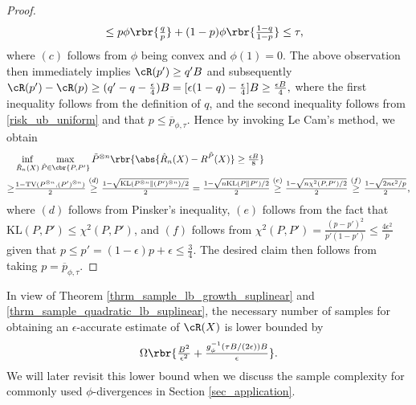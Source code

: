 \documentclass[9pt]{article} %
\numberwithin{equation}{section}
\renewcommand{\frac}[2]{\tfrac{#1}{#2}}
\begin{document}
\begin{proof}
\begin{align*}
& \leq p \phi \rbr{\frac{q}{p}} + (1-p) \phi \rbr{\frac{1-q}{1-p}} \leq \tau,
\end{align*}
where $(c)$ follows from $\phi$ being convex and $\phi(1) = 0$. 
The above observation then immediately implies  
$
\cR(p') \geq q'  B
$ 
and subsequently 
$
\cR(p') - \cR(p) \geq (q' - q - \frac{\epsilon}{4} ) B=[ \epsilon ( 1- q)  - \frac{\epsilon}{4} ] B \geq \frac{\epsilon B}{4},
$ 
where the first inequality follows from the definition of $q$, and the second inequality follows from \eqref{risk_ub_uniform} and that $p \leq \overline{p}_{\phi,\tau}$.
Hence by invoking Le Cam's method,
we obtain 
\begin{align*}
& \inf_{\hat{R}_n (X) } \max_{\tilde{P} \in \cbr{P, P'} } \tilde{P}^{\otimes n} \rbr{
\abs{\hat{R}_n (X) - R^{\tilde P}(X)} \geq \frac{\epsilon B}{8}  
} \\ 
 \geq & 
\frac{1 - \mathrm{TV}(P^{\otimes n}, (P')^{\otimes n}) }{2} 
 \overset{(d)}{\geq} 
\frac{1 - \sqrt{\mathrm{KL} (P^{\otimes n} \Vert (P')^{\otimes n} )/2 } }{2} 
=\frac{1 - \sqrt{n \mathrm{KL} (P \Vert P')  / 2} }{2}  
 \overset{(e)}{\geq} 
\frac{1 - \sqrt{n \mathrm{\chi}^2 (P, P') /2 } }{2}  
\overset{(f)}{\geq}  \frac{1 - \sqrt{2 n \epsilon^2/ p}}{2},
\end{align*}
where $(d)$ follows from Pinsker's inequality,  $(e)$ follows from the fact that 
$\mathrm{KL}(P,  P') \leq \chi^2(P, P')$,
and $(f)$ follows from 
$ \chi^2(P, P') = \frac{(p - p')^2}{p'(1-p')} \leq \frac{4\epsilon^2}{p}$ given that $p \leq p' = (1-\epsilon) p + \epsilon \leq \frac{3}{4}$. 
The desired claim then follows from taking $p = \overline{p}_{\phi,\tau}$. 
\end{proof}


In view of Theorem \ref{thrm_sample_lb_growth_suplinear} and \ref{thrm_sample_quadratic_lb_suplinear}, the necessary number of samples  for obtaining an $\epsilon$-accurate estimate of $\cR(X)$ is lower bounded by 
\begin{align}\label{eq_sample_lb_suplinear_max}
\Omega \rbr{  {
 \frac{B^2}{\epsilon^2} +  \frac{ g_{\phi}^{-1} (\tau B / (2\epsilon)) B }{  \epsilon } 
}
}.
\end{align}
We will later revisit this lower bound when we discuss the sample complexity  for commonly used $\phi$-divergences in Section \ref{sec_application}.
\end{document}

